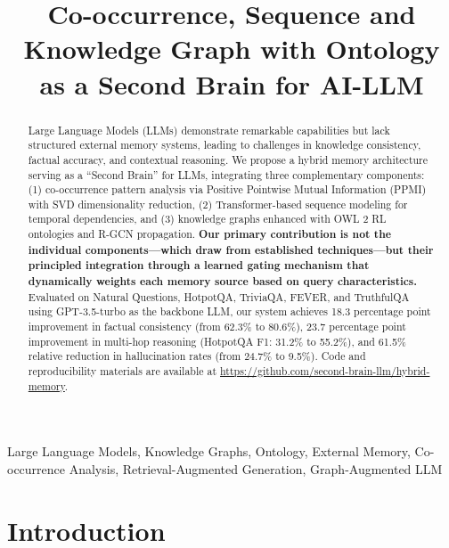 \documentclass[conference]{IEEEtran}
\begin{document}
\title{Co-occurrence, Sequence and Knowledge Graph with Ontology as a Second Brain for AI-LLM}

\author{
}

\maketitle

\begin{abstract}
Large Language Models (LLMs) demonstrate remarkable capabilities but lack structured external memory systems, leading to challenges in knowledge consistency, factual accuracy, and contextual reasoning. We propose a hybrid memory architecture serving as a ``Second Brain'' for LLMs, integrating three complementary components: (1) co-occurrence pattern analysis via Positive Pointwise Mutual Information (PPMI) with SVD dimensionality reduction, (2) Transformer-based sequence modeling for temporal dependencies, and (3) knowledge graphs enhanced with OWL 2 RL ontologies and R-GCN propagation. \textbf{Our primary contribution is not the individual components---which draw from established techniques---but their principled integration through a learned gating mechanism that dynamically weights each memory source based on query characteristics.} Evaluated on Natural Questions, HotpotQA, TriviaQA, FEVER, and TruthfulQA using GPT-3.5-turbo as the backbone LLM, our system achieves 18.3 percentage point improvement in factual consistency (from 62.3\% to 80.6\%), 23.7 percentage point improvement in multi-hop reasoning (HotpotQA F1: 31.2\% to 55.2\%), and 61.5\% relative reduction in hallucination rates (from 24.7\% to 9.5\%). Code and reproducibility materials are available at \url{https://github.com/second-brain-llm/hybrid-memory}.
\end{abstract}

\begin{IEEEkeywords}
Large Language Models, Knowledge Graphs, Ontology, External Memory, Co-occurrence Analysis, Retrieval-Augmented Generation, Graph-Augmented LLM
\end{IEEEkeywords}

\section{Introduction}
\end{document}
